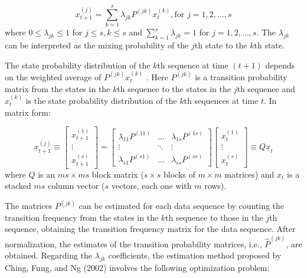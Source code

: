 \begin{equation}
x_{t+1}^{(j)} = \sum_{k=1}^s \lambda_{jk}P^{(jk)}x_{t}^{(k)}, \text{for } j =1, 2, \dots, s
\label{eq:eq1}
\end{equation}
where \(0 \leq \lambda_{jk} \leq 1\) for \(j \leq s, k \leq s\) and \(\sum_{k=1}^s \lambda_{jk} =1\) for \(j=1, 2, \dots, s\). The \(\lambda_{jk}\) can be interpreted as the mixing probability of the \(j\)th state to the \(k\)th state.

The state probability distribution of the \(k\)th sequence at time \((t + 1)\) depends on the weighted average of \(P^{(jk)}x_{t}^{(k)}\) . Here \(P^{(jk)}\) is a transition probability matrix from the states in the \(k\)th sequence to the states in the \(j\)th sequence and \(x_t^{(k)}\) is the state probability distribution of the \(k\)th sequences at time \(t\). In matrix form:

\begin{equation}
\underline{x}_{t+1}^{(j)} \equiv 
\left[ 
\begin{array}{c}
 x_{t+1}^{(1)} \\
 \vdots \\
 x_{t+1}^{(s)}
\end{array} \right ]
=
\left[ 
\begin{array}{ccc}
\lambda_{11}P^{(11)} & \dots & \lambda_{1s}P^{(1s)}\\
\vdots &  \ddots & \vdots\\
\lambda_{s1}P^{(s1)}& \dots & \lambda_{ss}P^{(ss)}
\end{array} \right ]
\left[ 
\begin{array}{c}
 x_{t}^{(1)} \\
 \vdots \\
 x_{t}^{(s)}
\end{array} \right ]
\equiv
Q \underline{x}_{t}
\label{eq:eq2}
\end{equation} where \(Q\) is an \(ms \times ms\) block matrix (\(s \times s\) blocks of \(m \times m\) matrices) and \(x_t\) is a stacked \(ms\) column vector (\(s\) vectors, each one with \(m\) rows).

The matrices \(P^{(jk)}\) can be estimated for each data sequence by counting the transition frequency from the states in the \(k\)th sequence to those in the \(j\)th sequence, obtaining the transition frequency matrix for the data sequence. After normalization, the estimates of the transition probability matrices, i.e., \(\widehat{P}^{(jk)}\), are obtained. Regarding the \(\lambda_{jk}\) coefficients, the estimation method proposed by Ching, Fung, and Ng (2002) involves the following optimization problem:

